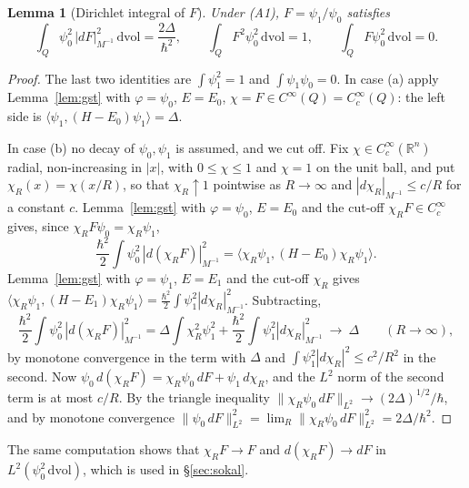 \documentclass[11pt,a4paper]{article}
\newtheorem{lemma}[theorem]{Lemma}
\theoremstyle{definition}
\theoremstyle{remark}
\newcommand{\R}{\mathbb{R}}
\newcommand{\dvol}{\,\mathrm{dvol}}
\begin{document}
\begin{lemma}[Dirichlet integral of $F$]\label{lem:cutoff}
Under (A1), $F=\psi_1/\psi_0$ satisfies
\[
  \int_Q\psi_0^2\,|dF|^2_{M^{-1}}\dvol=\frac{2\Delta}{\hbar^2},\qquad \int_Q F^2\psi_0^2\dvol=1,\qquad \int_Q F\psi_0^2\dvol=0 .
\]
\end{lemma}

\begin{proof}
The last two identities are $\int\psi_1^2=1$ and $\int\psi_1\psi_0=0$.
In case (a) apply Lemma~\ref{lem:gst} with $\varphi=\psi_0$, $E=E_0$, $\chi=F\in C^\infty(Q)=C_c^\infty(Q)$: the left side is $\langle\psi_1,(H-E_0)\psi_1\rangle=\Delta$.

In case (b) no decay of $\psi_0,\psi_1$ is assumed, and we cut off.
Fix $\chi\in C_c^\infty(\R^n)$ radial, non-increasing in $|x|$, with $0\le\chi\le1$ and $\chi=1$ on the unit ball, and put $\chi_R(x)=\chi(x/R)$, so that $\chi_R\uparrow1$ pointwise as $R\to\infty$ and $|d\chi_R|_{M^{-1}}\le c/R$ for a constant $c$.
Lemma~\ref{lem:gst} with $\varphi=\psi_0$, $E=E_0$ and the cut-off $\chi_RF\in C_c^\infty$ gives, since $\chi_RF\psi_0=\chi_R\psi_1$,
\[
  \frac{\hbar^2}{2}\int\psi_0^2\,|d(\chi_RF)|^2_{M^{-1}}=\bigl\langle\chi_R\psi_1,(H-E_0)\chi_R\psi_1\bigr\rangle .
\]
Lemma~\ref{lem:gst} with $\varphi=\psi_1$, $E=E_1$ and the cut-off $\chi_R$ gives $\langle\chi_R\psi_1,(H-E_1)\chi_R\psi_1\rangle=\tfrac{\hbar^2}{2}\int\psi_1^2|d\chi_R|^2_{M^{-1}}$.
Subtracting,
\[
  \frac{\hbar^2}{2}\int\psi_0^2\,|d(\chi_RF)|^2_{M^{-1}}=\Delta\int\chi_R^2\psi_1^2+\frac{\hbar^2}{2}\int\psi_1^2|d\chi_R|^2_{M^{-1}}\ \longrightarrow\ \Delta\qquad(R\to\infty),
\]
by monotone convergence in the term with $\Delta$ and $\int\psi_1^2|d\chi_R|^2\le c^2/R^2$ in the second.
Now $\psi_0\,d(\chi_RF)=\chi_R\psi_0\,dF+\psi_1\,d\chi_R$, and the $L^2$ norm of the second term is at most $c/R$.
By the triangle inequality $\|\chi_R\psi_0\,dF\|_{L^2}\to(2\Delta)^{1/2}/\hbar$, and by monotone convergence $\|\psi_0\,dF\|_{L^2}^2=\lim_R\|\chi_R\psi_0\,dF\|_{L^2}^2=2\Delta/\hbar^2$.
\end{proof}

The same computation shows that $\chi_RF\to F$ and $d(\chi_RF)\to dF$ in $L^2(\psi_0^2\dvol)$, which is used in \S\ref{sec:sokal}.
\end{document}
